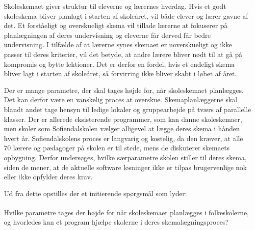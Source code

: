 Skoleskemaet giver struktur til eleverne og lærernes hverdag. Hvis et godt skoleskema bliver planlagt i starten af skoleåret, vil både elever og lærer gavne af det. Et forståeligt og overskueligt skema vil tillade lærerne at fokuserer på planlægningen af deres undervisning og eleverne får derved får bedre undervisning. I tilfælde af at lærerne synes skemaet er uoverskueligt og ikke passer til deres kriterier, vil det betyde, at andre lærere bliver nødt til at gå på kompromis og bytte lektioner. Det er derfor en fordel, hvis et endeligt skema bliver lagt  i starten af skoleåret, så forvirring ikke bliver skabt i løbet af året.

Der er mange parametre, der skal tages højde for, når skoleskemaet planlægges. Det kan derfor være en vanskelig proces at overskue. Skemaplanlæggerne skal blandt andet tage hensyn til ledige lokaler og gruppearbejde på tværs af parallelle klasser. Der er allerede eksisterende programmer, som kan danne skoleskemaer, men skoler som Sofiendalskolen vælger alligevel at lægge deres skema i hånden hvert år. Sofiendalskolens proces er langvarig og kostelig, da den kræver, at alle 70 lærere og pædagoger på skolen er til stede, mens de diskuterer skemaets opbygning. Derfor undersøges, hvilke særparametre skolen stiller til deres skema, siden de mener, at de aktuelle software løsninger ikke er tilpas brugervenlige nok eller ikke opfylder deres krav.

Ud fra dette opstilles der et initierende spørgsmål som lyder:
\\\\
Hvilke parametre tages der højde for når skoleskemaet planlægges i folkeskolerne, og hvorledes kan et program hjælpe skolerne i deres skemalægningsproces?